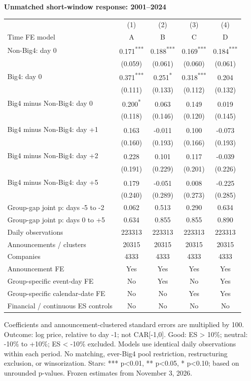 \documentclass[10pt]{article}
\newcommand{\sym}[1]{\textsuperscript{#1}}\pagestyle{empty}
\begin{document}
\noindent\textbf{Unmatched short-window response: 2001--2024}\par\medskip
\setlength{\tabcolsep}{3pt}\renewcommand{\arraystretch}{1.1}
\noindent\begin{tabular*}{\textwidth}{@{\extracolsep{\fill}}lcccc@{}}\toprule
 & (1) & (2) & (3) & (4) \\
Time FE model & A & B & C & D \\\midrule
Non-Big4: day 0 & 0.171\sym{***} & 0.188\sym{***} & 0.169\sym{***} & 0.184\sym{***} \\
 & (0.059) & (0.061) & (0.060) & (0.061) \\
Big4: day 0 & 0.371\sym{***} & 0.251\sym{*} & 0.318\sym{***} & 0.204\sym{} \\
 & (0.111) & (0.133) & (0.112) & (0.132) \\
Big4 minus Non-Big4: day 0 & 0.200\sym{*} & 0.063\sym{} & 0.149\sym{} & 0.019\sym{} \\
 & (0.118) & (0.146) & (0.120) & (0.145) \\
Big4 minus Non-Big4: day +1 & 0.163\sym{} & -0.011\sym{} & 0.100\sym{} & -0.073\sym{} \\
 & (0.160) & (0.193) & (0.166) & (0.193) \\
Big4 minus Non-Big4: day +2 & 0.228\sym{} & 0.101\sym{} & 0.117\sym{} & -0.039\sym{} \\
 & (0.191) & (0.229) & (0.201) & (0.226) \\
Big4 minus Non-Big4: day +5 & 0.179\sym{} & -0.051\sym{} & 0.008\sym{} & -0.225\sym{} \\
 & (0.240) & (0.289) & (0.273) & (0.285) \\
Group-gap joint p: days -5 to -2 & 0.062 & 0.513 & 0.290 & 0.634 \\
Group-gap joint p: days 0 to +5 & 0.634 & 0.855 & 0.855 & 0.890 \\
Daily observations & 223313 & 223313 & 223313 & 223313 \\
Announcements / clusters & 20315 & 20315 & 20315 & 20315 \\
Companies & 4333 & 4333 & 4333 & 4333 \\
Announcement FE & Yes & Yes & Yes & Yes \\
Group-specific event-day FE & No & Yes & No & Yes \\
Group-specific calendar-date FE & No & No & Yes & Yes \\
Financial / continuous ES controls & No & No & No & No \\
\bottomrule\end{tabular*}\par\medskip
\noindent\footnotesize Coefficients and announcement-clustered standard errors are multiplied by 100. Outcome: log price, relative to day -1; not CAR[-1,0]. Good: ES > 10\%; neutral: -10\% to +10\%; ES < -10\% excluded. Models use identical daily observations within each period. No matching, ever-Big4 pool restriction, restructuring exclusion, or winsorization. Stars: *** p<0.01, ** p<0.05, * p<0.10; based on unrounded p-values. Frozen estimates from November 3, 2026.\end{document}
\end{document}
